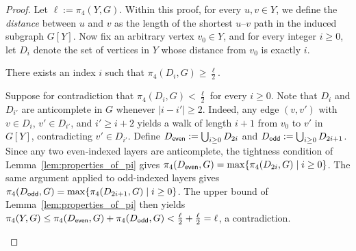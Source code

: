 \begin{proof}
    Let $\ell := \pi_4(Y,G)$. Within this proof, for every $u, v\in Y$, we define the \emph{distance} between $u$ and $v$ as the length of the shortest $u$--$v$ path in the induced subgraph $G[Y]$. Now fix an arbitrary vertex $v_0 \in Y$, and for every integer $i \geq 0$, let $D_i$ denote the set of vertices in $Y$ whose distance from $v_0$ is exactly $i$. 
    \begin{claim}\label{claim:heavy_index}
        There exists an index $i$ such that $\pi_4(D_i,G) \geq \frac{\ell}{2}$.
    \end{claim}
    \begin{claimproof}
        Suppose for contradiction that $\pi_4(D_i,G) < \frac{\ell}{2}$ for every $i \geq 0$. Note that $D_i$ and $D_{i'}$ are anticomplete in $G$ whenever $|i-i'| \geq 2$. Indeed, any edge $(v,v')$ with $v \in D_i$, $v' \in D_{i'}$, and $i' \geq i+2$ yields a walk of length $i+1$ from $v_0$ to $v'$ in $G[Y]$, contradicting $v' \in D_{i'}$. Define $D_{\sf even} := \bigcup_{i \geq 0} D_{2i}$ and $D_{\sf odd} := \bigcup_{i \geq 0} D_{2i+1}$. Since any two even-indexed layers are anticomplete, the tightness condition of Lemma~\ref{lem:properties_of_pi} gives $\pi_4(D_{\sf even},G) = \max\{\pi_4(D_{2i},G)\mid i\geq 0\}$. The same argument applied to odd-indexed layers gives $\pi_4(D_{\sf odd},G) = \max\{\pi_4(D_{2i+1},G)\mid i \geq 0\}$. The upper bound of Lemma~\ref{lem:properties_of_pi} then yields $\pi_4(Y,G) \leq \pi_4(D_{\sf even},G) + \pi_4(D_{\sf odd},G) < \frac{\ell}{2} + \frac{\ell}{2} = \ell$, a contradiction.
    \end{claimproof}
        
        

\end{proof}
